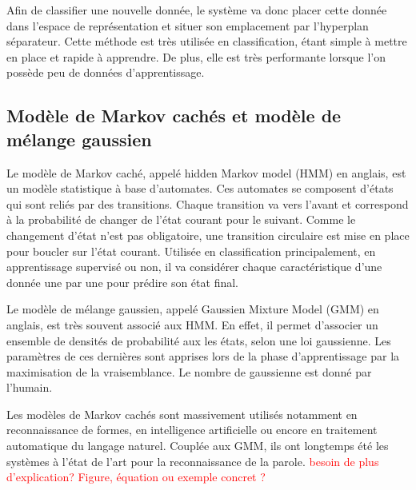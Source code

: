 Afin de classifier une nouvelle donnée, le système va donc placer cette donnée dans l'espace de représentation et situer son emplacement par l'hyperplan séparateur.
Cette méthode est très utilisée en classification, étant simple à mettre en place et rapide à apprendre. De plus, elle est très performante lorsque l'on possède peu de données d'apprentissage.

\subsection{Modèle de Markov cachés et modèle de mélange gaussien}

Le modèle de Markov caché, appelé hidden Markov model (HMM) en anglais, est un modèle statistique à base d'automates. Ces automates se composent d'états qui sont reliés par des transitions. Chaque transition va vers l'avant et correspond à la probabilité de changer de l'état courant pour le suivant. Comme le changement d'état n'est pas obligatoire, une transition circulaire est mise en place pour boucler sur l'état courant.
Utilisée en classification principalement, en apprentissage supervisé ou non, il va considérer chaque caractéristique d'une donnée une par une pour prédire son état final.

Le modèle de mélange gaussien, appelé Gaussien Mixture Model (GMM) en anglais, est très souvent associé aux HMM. En effet, il permet d'associer un ensemble de densités de probabilité aux les états, selon une loi gaussienne. Les paramètres de ces dernières sont apprises lors de la phase d'apprentissage par la maximisation de la vraisemblance. Le nombre de gaussienne est donné par l'humain.

Les modèles de Markov cachés sont massivement utilisés notamment en reconnaissance de formes, en intelligence artificielle ou encore en traitement automatique du langage naturel. Couplée aux GMM, ils ont longtemps été les systèmes à l'état de l'art pour la reconnaissance de la parole.
\textcolor{red}{besoin de plus d'explication? Figure, équation ou exemple concret ?}

